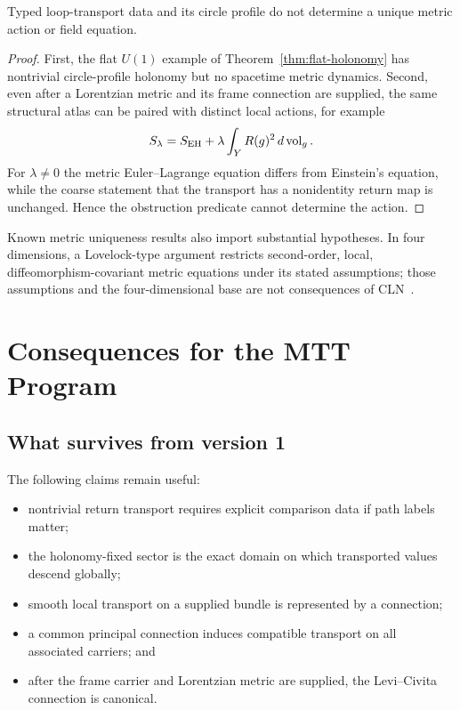 \documentclass[11pt]{article}
\begin{document}
\begin{theorem}
\label{thm:no-einstein}
Typed loop-transport data and its circle profile do not determine a unique
metric action or field equation.
\end{theorem}

\begin{proof}
First, the flat $U(1)$ example of
Theorem~\ref{thm:flat-holonomy} has nontrivial circle-profile holonomy but no
spacetime metric dynamics.  Second, even after a Lorentzian metric and its
frame connection are supplied, the same structural atlas can be paired with
distinct local actions, for example
\[
 S_\lambda
 =S_{\rm EH}
 +\lambda\int_Y R(g)^2\,d\operatorname{vol}_g.
\]
For $\lambda\ne0$ the metric Euler--Lagrange equation differs from Einstein's
equation, while the coarse statement that the transport has a nonidentity
return map is unchanged.  Hence the obstruction predicate cannot determine
the action.
\end{proof}

Known metric uniqueness results also import substantial hypotheses.  In four
dimensions, a Lovelock-type argument restricts second-order, local,
diffeomorphism-covariant metric equations under its stated assumptions; those
assumptions and the four-dimensional base are not consequences of
CLN~\cite{Lovelock}.

\section{Consequences for the MTT Program}

\subsection{What survives from version 1}

The following claims remain useful:
\begin{itemize}
\item nontrivial return transport requires explicit comparison data if path
labels matter;
\item the holonomy-fixed sector is the exact domain on which transported
values descend globally;
\item smooth local transport on a supplied bundle is represented by a
connection;
\item a common principal connection induces compatible transport on all
associated carriers; and
\item after the frame carrier and Lorentzian metric are supplied, the
Levi--Civita connection is canonical.
\end{itemize}
\end{document}
